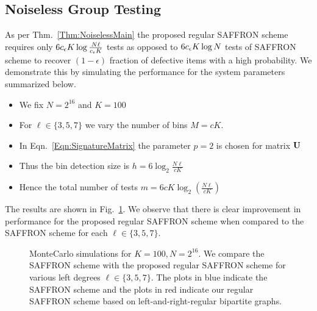 \subsection*{Noiseless Group Testing}
As per Thm.~\ref{Thm:NoiselessMain} the proposed regular SAFFRON scheme requires only $6c_{\epsilon} K\log \frac{N\ell}{c_{\epsilon} K}$ tests as opposed to $6c_{\epsilon} K\log N$ tests of SAFFRON scheme to recover $(1-\epsilon)$ fraction of defective items with a high probability. We demonstrate this by simulating the performance for the system parameters summarized below.
\begin{itemize}
\item We fix $N=2^{16}$ and $K=100$
\item For $\ell\in\{3,5,7\}$ we vary the number of bins $M=c K$. 
\item In Eqn.~\ref{Eqn:SignatureMatrix} the parameter $p=2$ is chosen for matrix $\mathbf{U}$
\item Thus the bin detection size is $h=6\log_2 \frac{N\ell}{cK}$
\item Hence the total number of tests $m=6cK\log_2 \left(\frac{N\ell}{cK}\right)$
\end{itemize} 
The results are shown in Fig.~\ref{Fig:SimulationNoiseless}. We observe that there is clear improvement in performance for the proposed regular SAFFRON scheme when compared to the SAFFRON scheme for each $\ell\in\{3,5,7\}$.

\begin{figure}[t!]
\centering
\resizebox{\columnwidth}{!}{}
\caption{MonteCarlo simulations for $K=100, N=2^{16}$. We compare the SAFFRON scheme \cite{lee2015saffron} with the proposed regular SAFFRON scheme for various left degrees $\ell\in\{3,5,7\}$. 
The plots in blue indicate the SAFFRON scheme and the plots in red indicate our regular SAFFRON scheme based on left-and-right-regular bipartite graphs.}
\label{Fig:SimulationNoiseless}
\end{figure}


